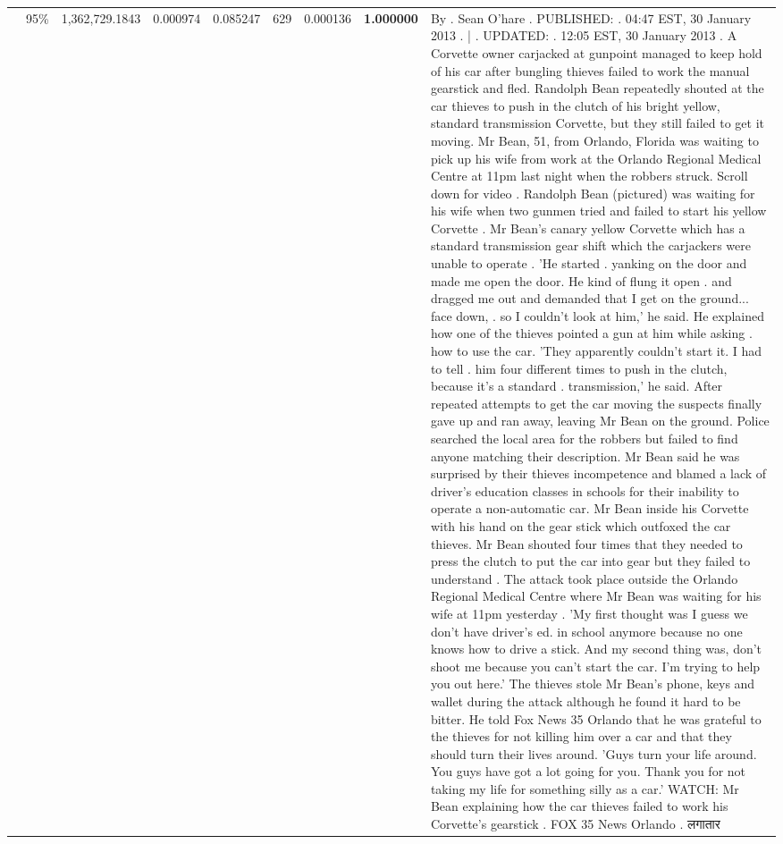 \begin{table}[H]
\begin{tabular}{llrrrrrrl}
 & 95\% & 1,362,729.1843 & 0.000974 & 0.085247 & \color{red} 629 & 0.000136 & \bfseries \color{red} 1.000000 & By . Sean O'hare . PUBLISHED: . 04:47 EST, 30 January 2013 . | . UPDATED: . 12:05 EST, 30 January 2013 . A Corvette owner carjacked at gunpoint managed to keep hold of his car after bungling thieves failed to work the manual gearstick and fled. Randolph Bean repeatedly shouted at the car thieves to push in the clutch of his bright yellow, standard transmission Corvette, but they still failed to get it moving. Mr Bean, 51, from Orlando, Florida was waiting to pick up his wife from work at the Orlando Regional Medical Centre at 11pm last night when the robbers struck. Scroll down for video . Randolph Bean (pictured) was waiting for his wife when two gunmen tried and failed to start his yellow Corvette . Mr Bean's canary yellow Corvette which has a standard transmission gear shift which the carjackers were unable to operate . 'He started . yanking on the door and made me open the door. He kind of flung it open . and dragged me out and demanded that I get on the ground... face down, . so I couldn't look at him,' he said. He explained how one of the thieves pointed a gun at him while asking . how to use the car. 'They apparently couldn't start it. I had to tell . him four different times to push in the clutch, because it's a standard . transmission,' he said. After repeated attempts to get the car moving the suspects finally gave up and ran away, leaving Mr Bean on the ground. Police searched the local area for the robbers but failed to find anyone matching their description. Mr Bean said he was surprised by their thieves incompetence and blamed a lack of driver's education classes in schools for their inability to operate a non-automatic car. Mr Bean inside his Corvette with his hand on the gear stick which outfoxed the car thieves. Mr Bean shouted four times that they needed to press the clutch to put the car into gear but they failed to understand . The attack took place outside the Orlando Regional Medical Centre where Mr Bean was waiting for his wife at 11pm yesterday . 'My first thought was I guess we don't have driver's ed. in school anymore because no one knows how to drive a stick. And my second thing was, don't shoot me because you can't start the car. I'm trying to help you out here.' The thieves stole Mr Bean's phone, keys and wallet during the attack although he found it hard to be bitter. He told Fox News 35 Orlando that he was grateful to the thieves for not killing him over a car and that they should turn their lives around. 'Guys turn your life around. You guys have got a lot going for you. Thank you for not taking my life for something silly as a car.' WATCH: Mr Bean explaining how the car thieves failed to work his Corvette's gearstick . FOX 35 News Orlando . लगातार \\

\end{tabular}
\end{table}
